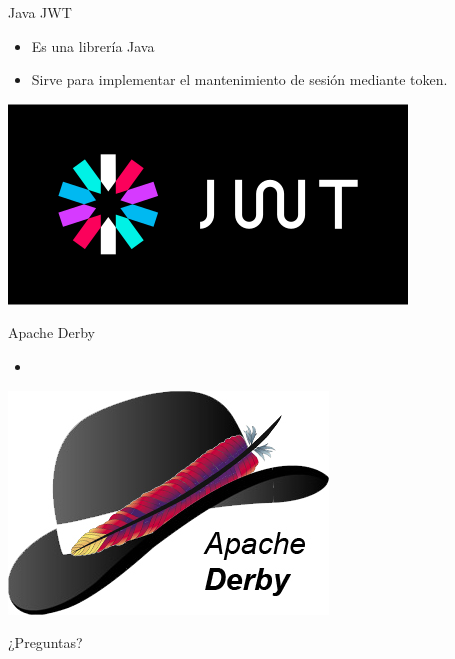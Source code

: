 \documentclass{beamer}
\begin{document}
            \begin{frame}{Java JWT}
                \begin{minipage}{0.70\textwidth}
                    \begin{itemize}
                        \item Es una librería Java
                        \item Sirve para implementar el mantenimiento de sesión mediante token.
                    \end{itemize}
                \end{minipage}
                \begin{minipage}{0.25\textwidth}
                    \includegraphics[width=\textwidth]{res/logo-jwt}
                \end{minipage}
            \end{frame}

            \begin{frame}{Apache Derby}
                \begin{minipage}{0.70\textwidth}
                    \begin{itemize}
                        \item
                    \end{itemize}
                \end{minipage}
                \begin{minipage}{0.25\textwidth}
                    \includegraphics[width=\textwidth]{res/logo-derby}
                \end{minipage}
            \end{frame}
    \begin{frame}[standout]
        ¿Preguntas?
    \end{frame}
\end{document}
